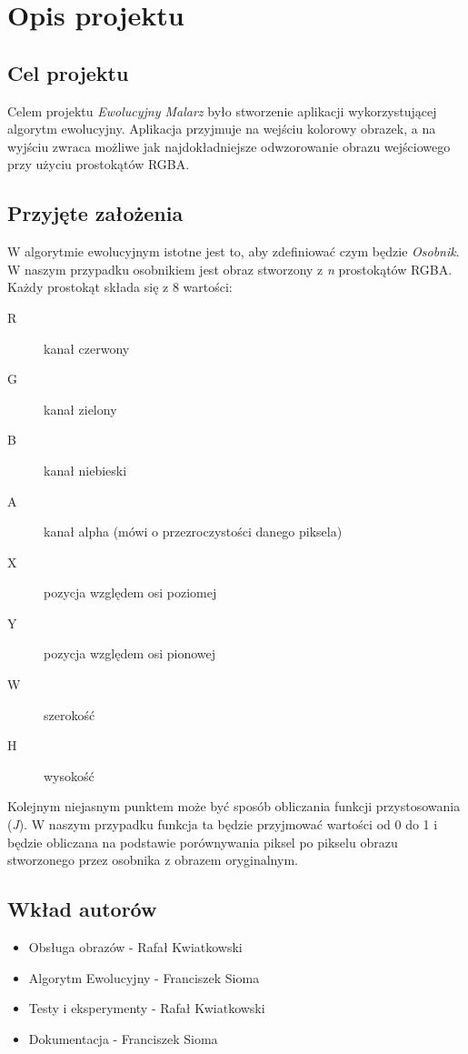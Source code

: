 \section{Opis projektu}
\subsection{Cel projektu}
Celem projektu {\it Ewolucyjny Malarz} było stworzenie aplikacji wykorzystującej algorytm ewolucyjny. Aplikacja przyjmuje na wejściu kolorowy obrazek, a na wyjściu zwraca możliwe jak najdokładniejsze odwzorowanie obrazu wejściowego przy użyciu prostokątów RGBA. 

\subsection{Przyjęte założenia}
W algorytmie ewolucyjnym istotne jest to, aby zdefiniować czym będzie {\it Osobnik}. W naszym przypadku osobnikiem jest obraz stworzony z {\it n} prostokątów RGBA. Każdy prostokąt składa się z 8 wartości: 
\begin{description}
    \item[R] kanał czerwony
    \item[G] kanał zielony
    \item[B] kanał niebieski
    \item[A] kanał alpha (mówi o przezroczystości danego piksela)
    \item[X] pozycja względem osi poziomej
    \item[Y] pozycja względem osi pionowej
    \item[W] szerokość
    \item[H] wysokość       
\end{description}

Kolejnym niejasnym punktem może być sposób obliczania funkcji przystosowania ({\it J}). W naszym przypadku funkcja ta będzie przyjmować wartości od 0 do 1 i będzie obliczana na podstawie porównywania piksel po pikselu obrazu stworzonego przez osobnika z obrazem oryginalnym.
\subsection{Wkład autorów}
\begin{itemize}
    \item Obsługa obrazów - Rafał Kwiatkowski
    \item Algorytm Ewolucyjny - Franciszek Sioma
    \item Testy i eksperymenty - Rafał Kwiatkowski
    \item Dokumentacja - Franciszek Sioma
\end{itemize}
